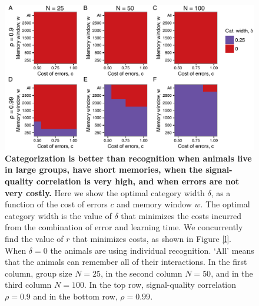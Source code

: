 \begin{figure}
\includegraphics[width=6.85in]{figures/strategies_heat_maps.pdf}
\caption{\sffamily\small\textbf{Categorization is better than recognition when animals live in large groups, have short memories, when the signal-quality correlation is very high, and when errors are not very costly.} Here we show the optimal category width $\delta$, as a function of the cost of errors $c$ and memory window $w$. The optimal category width is the value of $\delta$ that minimizes the costs incurred from the combination of error and learning time. We concurrently find the value of $r$ that minimizes costs, as shown in Figure \ref{l}. When $\delta=0$ the animals are using individual recognition. `All' means that the animals can remember all of their interactions. In the first column, group size $N=25$, in the second column $N=50$, and in the third column $N=100$. In the top row, signal-quality correlation $\rho=0.9$ and in the bottom row, $\rho=0.99$. }
\label{opt_delta}
\end{figure}


